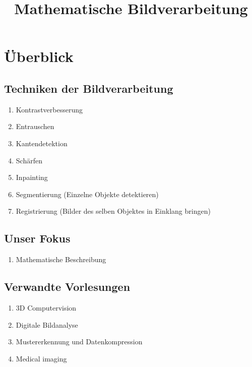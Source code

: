 \documentclass{article}
\theoremstyle{plain}
\theoremstyle{definition}
\numberwithin{equation}{section}
\begin{document}
\title{Mathematische Bildverarbeitung}
\date{}
\maketitle

\tableofcontents

\newpage

\section{Überblick}
    \subsection{Techniken der Bildverarbeitung}
        \begin{enumerate}[label=\textbullet]
            \item Kontrastverbesserung
            \item Entrauschen
            \item Kantendetektion
            \item Schärfen
            \item Inpainting
            \item Segmentierung (Einzelne Objekte detektieren)
            \item Registrierung (Bilder des selben Objektes in Einklang bringen)
        \end{enumerate}

    \subsection{Unser Fokus}
        \begin{enumerate}[label=\textbullet]
            \item Mathematische Beschreibung
        \end{enumerate}

    \subsection{Verwandte Vorlesungen}
        \begin{enumerate}[label=\textbullet]
            \item 3D Computervision
            \item Digitale Bildanalyse
            \item Mustererkennung und Datenkompression
            \item Medical imaging
        \end{enumerate}
\end{document}
